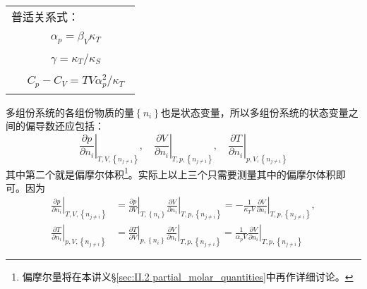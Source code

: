 \documentclass[main.tex]{subfiles}
\begin{document}
\begin{longtable}{m{}m{}}
  \multicolumn{2}{l}{{普适关系式：}}                                                                                                                                                                                                                                                                                              \\
                                               & \begin{align}\alpha_p=\beta_V\kappa_T\end{align}                                                                                                                                                                                                                           \\ [-10ex]
                                               & \begin{align}\gamma=\kappa_T/\kappa_S\end{align}                                                                                                                                                                                                                           \\[-10ex]
                                               & \begin{align}C_p-C_V=TV\alpha_p^2/\kappa_T\end{align}                                                                                                                                                                                                                      \\ [-4ex]

  \hline
\end{longtable}

多组份系统的各组份物质的量$\left\{n_i\right\}$也是状态变量，所以多组份系统的状态变量之间的偏导数还应包括：
\[\left.\frac{\partial p}{\partial n_i}\right|_{T,V,\left\{n_{j\neq i}\right\}},\quad\left.\frac{\partial V}{\partial n_i}\right|_{T,p,\left\{n_{j\neq i}\right\}},\quad\left.\frac{\partial T}{\partial n_i}\right|_{p,V,\left\{n_{j\neq i}\right\}}\]
其中第二个就是偏摩尔体积\footnote{偏摩尔量将在本讲义\S\ref{sec:II.2 partial_molar_quantities}中再作详细讨论。}。实际上以上三个只需要测量其中的偏摩尔体积即可。因为
\begin{align*}
  \left.\frac{\partial p}{\partial n_i}\right|_{T,V,\left\{n_{j\neq i}\right\}} & =\left.\frac{\partial p}{\partial V}\right|_{T,\left\{n_i\right\}}\left.\frac{\partial V}{\partial n_i}\right|_{T,p,\left\{n_{j\neq i}\right\}}=-\frac{1}{\kappa_TV}\left.\frac{\partial V}{\partial n_i}\right|_{T,p,\left\{n_{j\neq i}\right\}}, \\
  \left.\frac{\partial T}{\partial n_i}\right|_{p,V,\left\{n_{j\neq i}\right\}} & =\left.\frac{\partial T}{\partial V}\right|_{p,\left\{n_i\right\}}\left.\frac{\partial V}{\partial n_i}\right|_{T,p,\left\{n_{j\neq i}\right\}}=\frac{1}{\alpha_p V}\left.\frac{\partial V}{\partial n_i}\right|_{T,p,\left\{n_{j\neq i}\right\}}
\end{align*}
\end{document}
